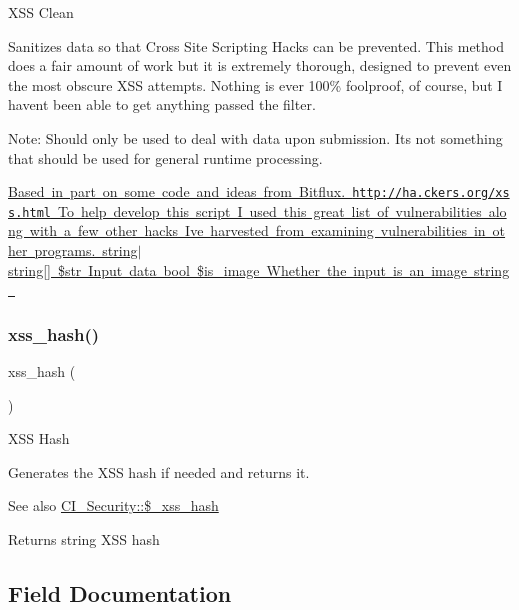 X\+SS Clean

Sanitizes data so that Cross Site Scripting Hacks can be prevented. This method does a fair amount of work but it is extremely thorough, designed to prevent even the most obscure X\+SS attempts. Nothing is ever 100\% foolproof, of course, but I haven\textquotesingle{}t been able to get anything passed the filter.

Note\+: Should only be used to deal with data upon submission. It\textquotesingle{}s not something that should be used for general runtime processing.

\mbox{\hyperlink{}{Based in part on some code and ideas from Bitflux.  \href{http://ha.ckers.org/xss.html}{\tt http\+://ha.\+ckers.\+org/xss.\+html} To help develop this script I used this great list of vulnerabilities along with a few other hacks I\textquotesingle{}ve harvested from examining vulnerabilities in other programs.  string$\vert$string\mbox{[}\mbox{]} \$str Input data  bool \$is\+\_\+image Whether the input is an image  string }}\mbox{\label{class_c_i___security_ae2f831d3f277e1c03730b28fd1734186}} 
\subsubsection{\texorpdfstring{xss\+\_\+hash()}{xss\_hash()}}
{\footnotesize\ttfamily xss\+\_\+hash (\begin{DoxyParamCaption}{ }\end{DoxyParamCaption})}

X\+SS Hash

Generates the X\+SS hash if needed and returns it.

\begin{DoxySeeAlso}{See also}
\mbox{\hyperlink{class_c_i___security_aca426a0e87199bfa36c7401a1d06a419}{C\+I\+\_\+\+Security\+::\$\+\_\+xss\+\_\+hash}} 
\end{DoxySeeAlso}
\begin{DoxyReturn}{Returns}
string X\+SS hash 
\end{DoxyReturn}


\subsection{Field Documentation}
\mbox{\label{class_c_i___security_a52043f2c9ffb0e14eade8e67a0172a82}} 
